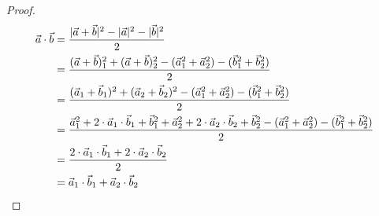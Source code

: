 \documentclass{article}
\begin{document}
\begin{proof}
\begin{align*}
	\vec{a} \cdot \vec{b} &= \frac{|\vec{a} + \vec{b}|^2 - |\vec{a}|^2 - |\vec{b}|^2}{2}\\
						  &= \frac{(\vec{a} + \vec{b})_1^2 + (\vec{a} + \vec{b})_2^2 - (\vec{a}_1^2 + \vec{a}_2^2) - (\vec{b}_1^2 + \vec{b}_2^2)}{2}\\
						  &= \frac{(\vec{a}_1 + \vec{b}_1)^2 + (\vec{a}_2 + \vec{b}_2)^2 - (\vec{a}_1^2 + \vec{a}_2^2) - (\vec{b}_1^2 + \vec{b}_2^2)}{2}\\
						  &= \frac{\vec{a}_1^2 + 2 \cdot \vec{a}_1 \cdot \vec{b}_1 + \vec{b}_1^2 + \vec{a}_2^2 + 2 \cdot \vec{a}_2 \cdot \vec{b}_2 + \vec{b}_2^2 - (\vec{a}_1^2 + \vec{a}_2^2) - (\vec{b}_1^2 + \vec{b}_2^2)}{2}\\
						  &= \frac{2 \cdot \vec{a}_1 \cdot \vec{b}_1 + 2 \cdot \vec{a}_2 \cdot \vec{b}_2}{2}\\
						  &= \vec{a}_1 \cdot \vec{b}_1 + \vec{a}_2 \cdot \vec{b}_2\qedhere
\end{align*}
\end{proof}
\end{document}
